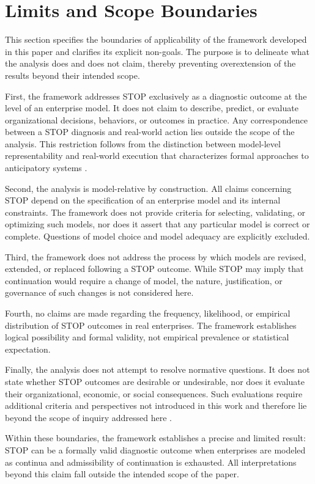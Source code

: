 ﻿\section{Limits and Scope Boundaries}

This section specifies the boundaries of applicability of the framework developed in this paper and clarifies its explicit non-goals. The purpose is to delineate what the analysis does and does not claim, thereby preventing overextension of the results beyond their intended scope.

First, the framework addresses STOP exclusively as a diagnostic outcome at the level of an enterprise model. It does not claim to describe, predict, or evaluate organizational decisions, behaviors, or outcomes in practice. Any correspondence between a STOP diagnosis and real-world action lies outside the scope of the analysis. This restriction follows from the distinction between model-level representability and real-world execution that characterizes formal approaches to anticipatory systems \cite{rosen1985}.

Second, the analysis is model-relative by construction. All claims concerning STOP depend on the specification of an enterprise model and its internal constraints. The framework does not provide criteria for selecting, validating, or optimizing such models, nor does it assert that any particular model is correct or complete. Questions of model choice and model adequacy are explicitly excluded.

Third, the framework does not address the process by which models are revised, extended, or replaced following a STOP outcome. While STOP may imply that continuation would require a change of model, the nature, justification, or governance of such changes is not considered here.

Fourth, no claims are made regarding the frequency, likelihood, or empirical distribution of STOP outcomes in real enterprises. The framework establishes logical possibility and formal validity, not empirical prevalence or statistical expectation.

Finally, the analysis does not attempt to resolve normative questions. It does not state whether STOP outcomes are desirable or undesirable, nor does it evaluate their organizational, economic, or social consequences. Such evaluations require additional criteria and perspectives not introduced in this work and therefore lie beyond the scope of inquiry addressed here \cite{churchman1971}.

Within these boundaries, the framework establishes a precise and limited result: STOP can be a formally valid diagnostic outcome when enterprises are modeled as continua and admissibility of continuation is exhausted. All interpretations beyond this claim fall outside the intended scope of the paper.
